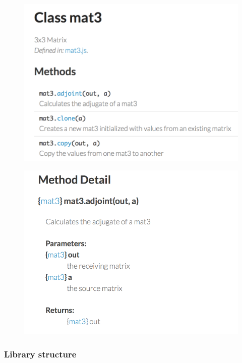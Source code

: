 \documentclass[]{article}
\begin{document}
\begin{figure}[htbp]
\centering
\includegraphics{images/mat3.png}
\end{figure}

\begin{figure}[htbp]
\centering
\includegraphics{images/mat3-adjoint.png}
\end{figure}

\subsubsection{Library structure}\label{library-structure}
\end{document}
